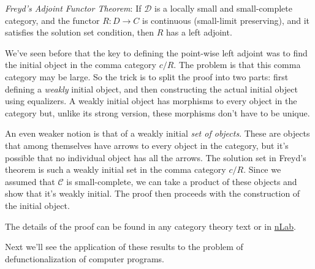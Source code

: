 \documentclass[11pt]{amsart}
\begin{document}
\emph{Freyd's Adjoint Functor Theorem}: If $\mathcal D$ is a locally small and small-complete category, and the functor $R \colon D \to C$ is continuous (small-limit preserving), and it satisfies the solution set condition, then $R$ has a left adjoint.

We've seen before that the key to defining the point-wise left adjoint was to find the initial object in the comma category $c/R$. The problem is that this comma category may be large. So the trick is to split the proof into two parts: first defining a \emph{weakly} initial object, and then constructing the actual initial object using equalizers. A weakly initial object has morphisms to every object in the category but, unlike its strong version, these morphisms don't have to be unique. 

An even weaker notion is that of a weakly initial \emph{set of objects}. These are objects that among themselves have arrows to every object in the category, but it's possible that no individual object has all the arrows. The solution set in Freyd's theorem is such a weakly initial set in the comma category $c/R$. Since we assumed that $\mathcal C$ is small-complete, we can take a product of these objects and show that it's weakly initial. The proof then proceeds with the construction of the initial object. 

The details of the proof can be found in any category theory text or in \href{https://ncatlab.org/nlab/show/adjoint+functor+theorem}{nLab}. 

Next we'll see the application of these results to the problem of defunctionalization of computer programs.
\end{document}
